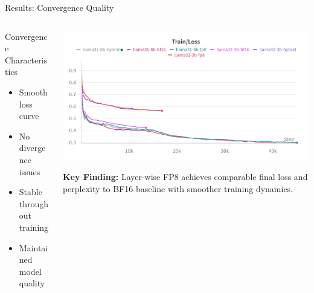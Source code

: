 \begin{frame}{Results: Convergence Quality}

\begin{columns}[c]
\begin{column}{0.40\textwidth}
   
    \vspace{0.3cm}

    \begin{block}{Convergence Characteristics}
    \begin{itemize}
        \item Smooth loss curve
        \item No divergence issues
        \item Stable throughout training
        \item Maintained model quality
    \end{itemize}
    \end{block}
\end{column}

\begin{column}{0.60\textwidth}
    \centering
    \includegraphics[width=\textwidth]{figures/avg_loss.png}

    \vspace{0.3cm}

    \small
    \textbf{Key Finding:} Layer-wise FP8 achieves comparable final loss and perplexity to BF16 baseline with smoother training dynamics.
\end{column}
\end{columns}

\end{frame}
